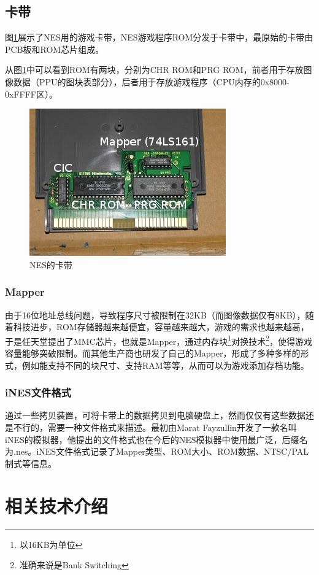 \documentclass[a4paper]{ltxdoc}
\begin{document}
{\subsection{卡带}
图\ref{fig:cartridge}展示了NES用的游戏卡带，NES游戏程序ROM分发于卡带中，最原始的卡带由PCB板和ROM芯片组成。

从图\ref{fig:cartridge}中可以看到ROM有两块，分别为CHR ROM和PRG ROM，前者用于存放图像数据（PPU的图块表部分），后者用于存放游戏程序（CPU内存的0x8000-0xFFFF区）。

\begin{figure}[h]
	\centering
	\includegraphics{images/cartridge.jpg}
	\caption{NES的卡带}
	\label{fig:cartridge}
\end{figure}

\subsubsection{Mapper}
由于16位地址总线问题，导致程序尺寸被限制在32KB（而图像数据仅有8KB），随着科技进步，ROM存储器越来越便宜，容量越来越大，游戏的需求也越来越高，于是任天堂提出了MMC芯片，也就是Mapper，通过内存块\footnote{以16KB为单位}对换技术\footnote{准确来说是Bank Switching}，使得游戏容量能够突破限制。而其他生产商也研发了自己的Mapper，形成了多种多样的形式，例如能支持不同的块尺寸、支持RAM等等，从而可以为游戏添加存档功能。

\subsubsection{iNES文件格式}
通过一些拷贝装置，可将卡带上的数据拷贝到电脑硬盘上，然而仅仅有这些数据还是不行的，需要一种文件格式来描述。最初由Marat Fayzullin开发了一款名叫iNES的模拟器，他提出的文件格式也在今后的NES模拟器中使用最广泛，后缀名为.nes。iNES文件格式记录了Mapper类型、ROM大小、ROM数据、NTSC/PAL制式等信息。

\section{相关技术介绍}
}
\end{document}
